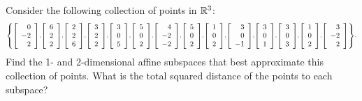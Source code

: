\documentclass{ximera}
\begin{document}
\begin{exercise}
  Consider the following collection of points in $\R^3$:
  \begin{equation*}\scriptstyle
    \set{
      \startmat{r} 0 \\ -2 \\ 2 \stopmat,
      \startmat{r} 6 \\ 2 \\ 2 \stopmat,
      \startmat{r} 2 \\ 2 \\ 6 \stopmat,
      \startmat{r} 3 \\ 2 \\ 2 \stopmat,
      \startmat{r} 3 \\ 0 \\ 5 \stopmat,
      \startmat{r} 5 \\ 0 \\ 2 \stopmat,
      \startmat{r} 4 \\ -2 \\ -2 \stopmat,
      \startmat{r} 5 \\ 0 \\ 2 \stopmat,
      \startmat{r} 1 \\ 0 \\ 2 \stopmat,
      \startmat{r} 3 \\ 0 \\ -1 \stopmat,
      \startmat{r} 3 \\ 0 \\ 1 \stopmat,
      \startmat{r} 3 \\ 0 \\ 3 \stopmat,
      \startmat{r} 1 \\ 0 \\ 2 \stopmat,
      \startmat{r} 3 \\ -2 \\ 2 \stopmat
    }.
  \end{equation*}
  Find the 1- and 2-dimensional affine subspaces that best approximate
  this collection of points. What is the total squared
  distance of the points to each subspace?
\end{exercise}
\end{document}
